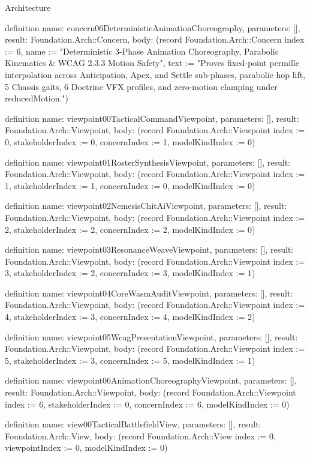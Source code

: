 \begin{lexlean}{Architecture}
\begin{semanticmodule}
definition{
  name: concern06DeterministicAnimationChoreography,
  parameters: [],
  result: Foundation.Arch::Concern,
  body: (record Foundation.Arch::Concern {index := 6, name := "Deterministic 3-Phase Animation Choreography, Parabolic Kinematics & WCAG 2.3.3 Motion Safety", text := "Proves fixed-point permille interpolation across Anticipation, Apex, and Settle sub-phases, parabolic hop lift, 5 Chassis gaits, 6 Doctrine VFX profiles, and zero-motion clamping under reducedMotion."})
}

definition{
  name: viewpoint00TacticalCommandViewpoint,
  parameters: [],
  result: Foundation.Arch::Viewpoint,
  body: (record Foundation.Arch::Viewpoint {index := 0, stakeholderIndex := 0, concernIndex := 1, modelKindIndex := 0})
}

definition{
  name: viewpoint01RosterSynthesisViewpoint,
  parameters: [],
  result: Foundation.Arch::Viewpoint,
  body: (record Foundation.Arch::Viewpoint {index := 1, stakeholderIndex := 1, concernIndex := 0, modelKindIndex := 0})
}

definition{
  name: viewpoint02NemesisChitAiViewpoint,
  parameters: [],
  result: Foundation.Arch::Viewpoint,
  body: (record Foundation.Arch::Viewpoint {index := 2, stakeholderIndex := 2, concernIndex := 2, modelKindIndex := 0})
}

definition{
  name: viewpoint03ResonanceWeaveViewpoint,
  parameters: [],
  result: Foundation.Arch::Viewpoint,
  body: (record Foundation.Arch::Viewpoint {index := 3, stakeholderIndex := 2, concernIndex := 3, modelKindIndex := 1})
}

definition{
  name: viewpoint04CoreWasmAuditViewpoint,
  parameters: [],
  result: Foundation.Arch::Viewpoint,
  body: (record Foundation.Arch::Viewpoint {index := 4, stakeholderIndex := 3, concernIndex := 4, modelKindIndex := 2})
}

definition{
  name: viewpoint05WcagPresentationViewpoint,
  parameters: [],
  result: Foundation.Arch::Viewpoint,
  body: (record Foundation.Arch::Viewpoint {index := 5, stakeholderIndex := 3, concernIndex := 5, modelKindIndex := 1})
}

definition{
  name: viewpoint06AnimationChoreographyViewpoint,
  parameters: [],
  result: Foundation.Arch::Viewpoint,
  body: (record Foundation.Arch::Viewpoint {index := 6, stakeholderIndex := 0, concernIndex := 6, modelKindIndex := 0})
}

definition{
  name: view00TacticalBattlefieldView,
  parameters: [],
  result: Foundation.Arch::View,
  body: (record Foundation.Arch::View {index := 0, viewpointIndex := 0, modelKindIndex := 0})
}


\end{semanticmodule}
\end{lexlean}
